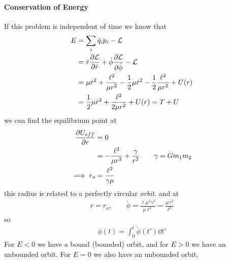 \documentclass[../main.tex]{subfiles}
\begin{document}
\paragraph*{Conservation of Energy} If this problem is independent of time we know that
\begin{align*}
    E &= \sum_i \dot q_i p_i - \mathcal{L} \\
    &= \dot r \pdv{\mathcal{L}}{\dot r} + \dot\phi \pdv{\mathcal{L}}{\dot\phi} - \mathcal{L} \\
    &= \mu \dot r^2 + \frac{\ell^2}{\mu r^2} - \frac{1}{2} \mu \dot r^2 
        - \frac{1}{2} \frac{\ell^2}{\mu r^2} + U(r) \\
    &= \frac{1}{2} \mu \dot r^2 + \frac{\ell^2}{2\mu r^2} + U(r) = T + U
\end{align*}
we can find the equilibrium point at
\begin{align*}
    \pdv{U_{eff}}{r} &= 0  \\
    &= - \frac{\ell^2}{\mu r^3} + \frac{\gamma}{r^2} \qquad \gamma = G m_1 m_2 \\
    \implies r_o &= \frac{\ell^2}{\gamma \mu}
\end{align*}
this radius is related to a perfectly circular \emph{orbit}. and at
\begin{align*}
    r = r_o,\qquad \dot\phi = \frac{\ell \mu^2 \gamma^2}{\mu \ell^4} = \frac{\mu \gamma^2}{\ell^3}
\end{align*}
so
\begin{align*}
    \phi(t) = \int_0^t \dot\phi(t') \dd{t'}
\end{align*}
For $E<0$ we have a bound (bounded) orbit, and for $E>0$ we have an unbounded orbit. For $E=0$ we
also have an unbounded orbit. 
\end{document}

